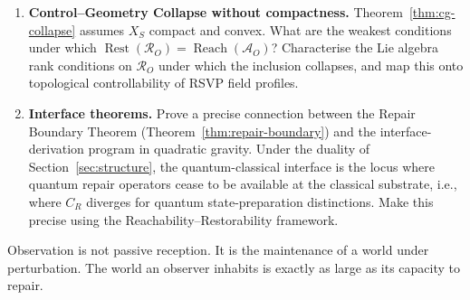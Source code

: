 \documentclass[12pt, oneside]{article}
\theoremstyle{plain}
\theoremstyle{definition}
\theoremstyle{remark}
\theoremstyle{definition}
\DeclareMathOperator{\Rest}{Rest}
\DeclareMathOperator{\Reach}{Reach}
\newcommand{\CR}{C_{\!R}}
\newcommand{\AO}{\mathcal{A}_O}
\newcommand{\Xsub}{X_S}
\begin{document}
\begin{enumerate}
  \item \textbf{Control--Geometry Collapse without compactness.}\;
    Theorem~\ref{thm:cg-collapse} assumes $\Xsub$ compact and convex.
    What are the weakest conditions under which
    $\Rest(\mathcal{R}_O) = \Reach(\AO)$?
    Characterise the Lie algebra rank conditions on $\mathcal{R}_O$
    under which the inclusion collapses, and map this onto
    topological controllability of RSVP field profiles.

  \item \textbf{Interface theorems.}\;
    Prove a precise connection between the Repair Boundary Theorem
    (Theorem~\ref{thm:repair-boundary}) and the interface-derivation
    program in quadratic gravity.
    Under the duality of Section~\ref{sec:structure}, the
    quantum-classical interface is the locus where quantum repair
    operators cease to be available at the classical substrate, i.e.,
    where $\CR$ diverges for quantum state-preparation distinctions.
    Make this precise using the Reachability--Restorability framework.
\end{enumerate}

\medskip
Observation is not passive reception.
It is the maintenance of a world under perturbation.
The world an observer inhabits is exactly as large as its capacity to
repair.
\end{document}
